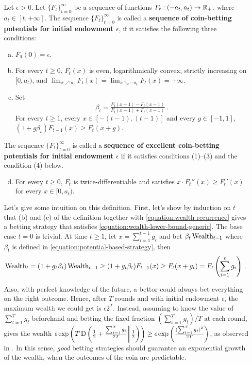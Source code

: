 \begin{definition}
\label{definition:potential}
Let $\epsilon > 0$. Let $\{F_t\}_{t=0}^\infty$ be a sequence of functions
$F_t:(-a_t, a_t)  \to \mathbb{R}_+$, where $a_t \in [t, +\infty]$.  The sequence
$\{F_t\}_{t=0}^\infty$ is called a \textbf{sequence of coin-betting potentials
for initial endowment $\epsilon$}, if it satisfies the following three
conditions:
\begin{enumerate}[(a)]
\item $F_0(0) = \epsilon$.

\item For every $t \ge 0$, $F_t(x)$ is even, logarithmically convex, strictly
increasing on $[0,a_t)$, and
$\lim_{x \nearrow a_t} F_t(x) = \lim_{x \searrow -a_t} F_t(x) = +\infty$.
\item Set 
\begin{equation}
\label{equation:potential-based-strategy}
\beta_t=\tfrac{F_t(x + 1) - F_t(x - 1)}{F_t(x + 1) + F_t(x - 1)} \;.
\end{equation}
For every $t \ge 1$, every $x \in [-(t-1), (t-1)]$ and every $g \in [-1,1]$, $\left(1 + g \beta_t \right) F_{t-1}(x) \ge F_t(x+g)$.
\end{enumerate}
The sequence $\{F_t\}_{t=0}^\infty$ is called a
\textbf{sequence of excellent coin-betting potentials for initial
endowment $\epsilon$} if it satisfies conditions (1)--(3) and the condition (4)
below.
\begin{enumerate}[(a)]
\setcounter{enumi}{3}
\item For every $t \ge 0$, $F_t$ is twice-differentiable and
satisfies $x \cdot F_t''(x) \ge F_t'(x)$ for every $x \in [0,a_t)$.
\end{enumerate}
\end{definition}

Let's give some intuition on this definition.
First, let's show by induction on $t$ that (b) and (c) of
the definition together with \eqref{equation:wealth-recurrence} gives a betting strategy that 
satisfies \eqref{equation:wealth-lower-bound-generic}. The base case $t=0$ is trivial. At time $t \ge 1$, let $x = \sum_{i=1}^{t-1} g_i$ and bet $\beta_t \operatorname{Wealth}_{t-1}$ where $\beta_t$ is defined in \eqref{equation:potential-based-strategy}, then
\vspace{-.2cm}
\[
\operatorname{Wealth}_t
= (1+g_t \beta_t) \operatorname{Wealth}_{t-1}
\ge (1 + g_t \beta_t) F_{t-1}(x)
\ge F_t(x + g_t)
= F_t \left( \sum_{i=1}^t g_i \right) \; .
\]

Also, with perfect knowledge of the future, a bettor could always bet everything on the right outcome. Hence, after $T$ rounds and with initial endowment $\epsilon$, the maximum wealth we could get is $\epsilon 2^T$. 
Instead, assuming to know the value of $\sum_{t=1}^T g_t$ beforehand and betting the fixed fraction $(\sum_{t=1}^T g_t)/T$ at each round, gives the wealth 
$\epsilon \exp\left(T \operatorname*{D}\left({\tfrac{1}{2}+\tfrac{\sum_{t=1}^T g_t}{2 T}}\middle\|{\tfrac{1}{2}}\right)\right) \geq \epsilon \exp\left(\tfrac{(\sum_{t=1}^T g_t)^2}{2 T}\right)$, as observed in \cite{McMahan-Abernethy-2013}.
In this sense, \emph{good} betting strategies should guarantee an exponential growth of the wealth, when the outcomes of the coin are predictable.

